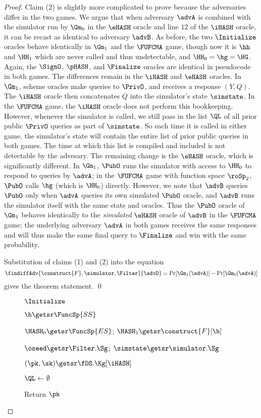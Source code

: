 \begin{proof}
	Claim (2) is slightly more complicated to prove because the adversaries differ in the two games. 
	We argue that when adversary $\advA$ is combined with the simulator run by $\Gm_0$ in the $\eHASH$ oracle and line $12$ of the $\iHASH$ oracle, it can be recast as identical to adversary $\advB$.  
	As before, the two $\Initialize$ oracles behave identically in $\Gm_1$ and the $\FUFCMA$ game, though now it is $\hh$ and $\HH_1$ which are never called and thus undetectable, and $\HH_0 = \hg = \HG$. 
	Again, the $\SignO$, $\pHASH$, and $\Finalize$ oracles are identical in pseudocode in both games.
	The differences remain in the $\iHASH$ and $\eHASH$ oracles.
	In $\Gm_1$, scheme oracles make queries to $\PrivO$, and receives a response $(Y,Q)$. 
	The $\iHASH$ oracle then concatenates $Q$ into the simulator's state $\simstate$.
	In the $\FUFCMA$ game, the $\iHASH$ oracle does not perform this bookkeeping. However, whenever the simulator is called, we still pass in the list $\QL$ of all prior public $\PrivO$ queries as part of $\simstate$.
	So each time it is called in either game, the simulator's state will contain the entire list of prior public queries in both games. 
	The time at which this list is compiled and included is not detectable by the advesary. 
	The remaining change is the $\eHASH$ oracle, which is significantly different. 
	In $\Gm_1$, $\PubO$ runs the simulator with access to $\HH_0$ to respond to queries by $\advA$; in the $\FUFCMA$ game with function space $\roSp_2$, $\PubO$ calls $\hg$ (which is $\HH_0$) directly. 
	However, we note that $\advB$ queries $\PubO$ only when $\advA$ queries its own simulated $\PubO$ oracle, and $\advB$ runs the simulator itself with the same state and oracles.
	Thus the $\PubO$ oracle of $\Gm_1$ behaves identically to the \emph{simulated} $\eHASH$ oracle of $\advB$ in the $\FUFCMA$ game; the underlying adversary $\advA$ in both games receives the same responses and will thus make the same final query to $\Finalize$ and win with the same probability.
	
	Substitution of claims (1) and (2) into the equation 
	\[\findiffAdv{\construct{F},\simulator,\Filter}{\advD} = \Pr[\Gm_1(\advA)] - \Pr[\Gm_0(\advA)]\]
	 gives the theorem statement. \qed
	
	\begin{figure}[t]
		{
			
			\ExptSepSpace
				\begin{oracle}{$\Initialize$}
				\item $\h \getsr \FuncSp{SS}$
				\item $\HASH_0 \getsr \FuncSp{ES}$; $\HASH_1 \getsr \construct{F}[\h]$
				\item $\oseed\getsr\Filter.\Sg$; $\simstate \getsr \simulator.\Sg$
				\item $(\pk, \sk) \getsr \fDS.\Kg[\iHASH]$
				\item $\QL \gets \emptyset$
				\item Return $\pk$
			\end{oracle}
			\ExptSepSpace
			
}
\end{figure}
\end{proof}
